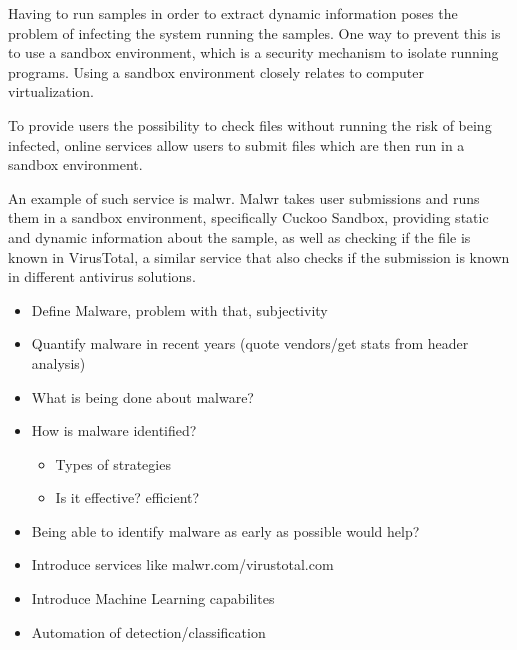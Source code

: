 \documentclass{llncs}
\begin{document}
Having to run samples in order to extract dynamic information poses the problem of infecting the system running the samples. One way to prevent this is to use a sandbox environment, which is a security mechanism to isolate running programs. Using a sandbox environment closely relates to computer virtualization.

To provide users the possibility to check files without running the risk of being infected, online services allow users to submit files which are then run in a sandbox environment.

An example of such service is malwr. Malwr takes user submissions and runs them in a sandbox environment, specifically Cuckoo Sandbox, providing static and dynamic information about the sample, as well as checking if the file is known in VirusTotal, a similar service that also checks if the submission is known in different antivirus solutions.


\hfill \break


\begin{itemize}
	\item Define Malware, problem with that, subjectivity
	\item Quantify malware in recent years (quote vendors/get stats from header analysis)
	\item What is being done about malware?
	\item How is malware identified?
	\begin{itemize}
		\item Types of strategies
		\item Is it effective? efficient?
	\end{itemize}
	\item Being able to identify malware as early as possible would help?
	\item Introduce services like malwr.com/virustotal.com
	\item Introduce Machine Learning capabilites
	\item Automation of detection/classification
\end{itemize}
\end{document}
